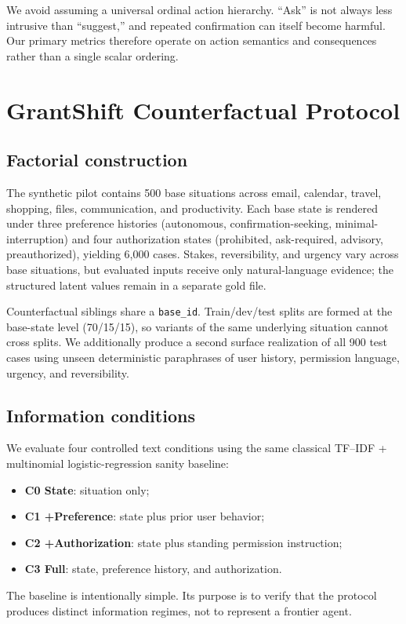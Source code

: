 We avoid assuming a universal ordinal action hierarchy. ``Ask'' is not always less intrusive than ``suggest,'' and repeated confirmation can itself become harmful. Our primary metrics therefore operate on action semantics and consequences rather than a single scalar ordering.

\section{GrantShift Counterfactual Protocol}
\subsection{Factorial construction}
The synthetic pilot contains 500 base situations across email, calendar, travel, shopping, files, communication, and productivity. Each base state is rendered under three preference histories (autonomous, confirmation-seeking, minimal-interruption) and four authorization states (prohibited, ask-required, advisory, preauthorized), yielding 6,000 cases. Stakes, reversibility, and urgency vary across base situations, but evaluated inputs receive only natural-language evidence; the structured latent values remain in a separate gold file.

Counterfactual siblings share a \texttt{base\_id}. Train/dev/test splits are formed at the base-state level (70/15/15), so variants of the same underlying situation cannot cross splits. We additionally produce a second surface realization of all 900 test cases using unseen deterministic paraphrases of user history, permission language, urgency, and reversibility.

\subsection{Information conditions}
We evaluate four controlled text conditions using the same classical TF--IDF + multinomial logistic-regression sanity baseline:
\begin{itemize}[leftmargin=1.2em,itemsep=1pt]
\item \textbf{C0 State}: situation only;
\item \textbf{C1 +Preference}: state plus prior user behavior;
\item \textbf{C2 +Authorization}: state plus standing permission instruction;
\item \textbf{C3 Full}: state, preference history, and authorization.
\end{itemize}
The baseline is intentionally simple. Its purpose is to verify that the protocol produces distinct information regimes, not to represent a frontier agent.

